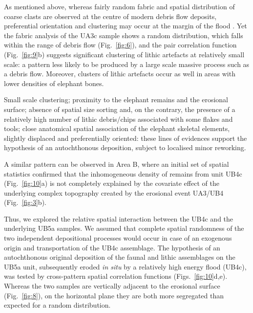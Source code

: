 \documentclass[review,authoryear,times]{elsarticle} %
\begin{document}
As mentioned above, whereas fairly random fabric and spatial distribution of coarse clasts are observed at the centre of modern debris flow deposits, preferential orientation and clustering may occur at the margin of the flood \citep{Pierson2005}. Yet the fabric analysis of the UA3c sample shows a random distribution, which falls within the range of debris flow (Fig.~\ref{fig:6}), and the pair correlation function (Fig.~\ref{fig:9}b) suggests significant clustering of lithic artefacts at relatively small scale: a pattern less likely to be produced by a large scale massive process such as a debris flow. Moreover, clusters of lithic artefacts occur as well in areas with lower densities of elephant bones.

Small scale clustering; proximity to the elephant remains and the erosional surface; absence of spatial size sorting and, on the contrary, the presence of a relatively high number of lithic debris/chips associated with some flakes and tools; close anatomical spatial association of the elephant skeletal elements, slightly displaced and preferentially oriented: these lines of evidences support the hypothesis of an autochthonous deposition, subject to localised minor reworking.


A similar pattern can be observed in Area B, where an initial set of spatial statistics confirmed that the inhomogeneous density of remains from unit UB4c (Fig.~\ref{fig:10}a) is not completely explained by the covariate effect of the underlying complex topography created by the erosional event UA3/UB4 (Fig.~\ref{fig:3}b).

Thus, we explored the relative spatial interaction between the UB4c and the underlying UB5a samples. We assumed that complete spatial randomness of the two independent depositional processes would occur in case of an exogenous origin and transportation of the UB4c assemblage. The hypothesis of an autochthonous original deposition of the faunal and lithic assemblages on the UB5a unit, subsequently eroded \emph{in situ} by a relatively high energy flood (UB4c), was tested by cross-pattern spatial correlation functions (Figs.~\ref{fig:10}d,e). Whereas the two samples are vertically adjacent to the erosional surface (Fig.~\ref{fig:8}), on the horizontal plane they are both more segregated than expected for a random distribution.
\end{document}
